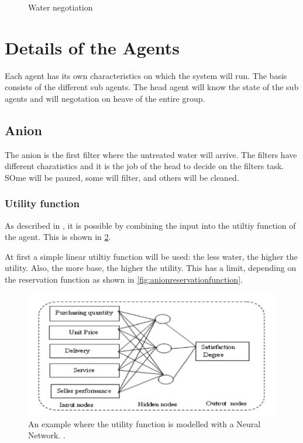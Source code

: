 \begin{figure}
	\centering
	\caption{Water negotiation}
	\label{fig:agent-plant-water}
\end{figure}


\section{Details of the Agents}
Each agent has its own characteristics on which the system will run. The basis consists of the different sub agents. The head agent will know the state of the sub agents and will negotation on heave of the entire group. 
\subsection{Anion}
The anion is the first filter where the untreated water will arrive. The filters have different charatistics and it is the job of the head to decide on the filters task. SOme will be pauzed, some will filter, and others will be cleaned. 
\subsubsection{Utility function}
As described in \citet{wong2010multi}, it is possible by combining the input into the utiltiy function of the agent. This is shown in \cref{fig:wongutiltiyneuralnetwork}. 

At first a simple linear utiltiy function will be used: the less water, the higher the utility. Also, the more base, the higher the utility. This has a limit, depending on the reservation function as shown in \cref{fig:anionreservationfunction}.


\begin{figure}
	\centering
	\includegraphics[width=0.7\linewidth]{img/wong_utiltiy_NeuralNetwork}
	\caption{An example where the utility function is modelled with a Neural Network. \citep{wong2010multi}.}
	\label{fig:wongutiltiyneuralnetwork}
\end{figure}

